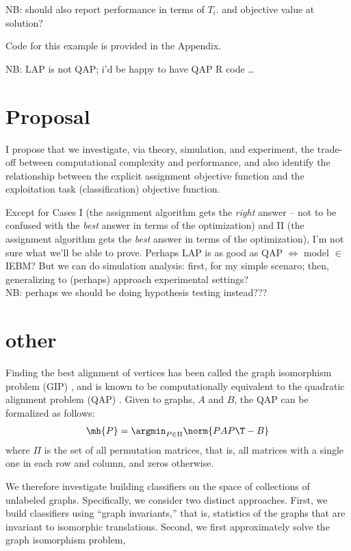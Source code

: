NB:
should also report performance in terms of $T_i$.
and objective value at solution?

Code for this example is provided in the Appendix.

NB: LAP is not QAP; i'd be happy to have QAP R code \dots

\section{Proposal}

I propose that we investigate,
via theory, simulation, and experiment,
the trade-off between computational complexity and performance,
and also identify the relationship between
the explicit assignment objective function
and the exploitation task (classification) objective function.

Except for Cases
I
(the assignment algorithm gets the {\em right} answer --
not to be confused with the {\em best} answer in terms of the optimization)
and
II
(the assignment algorithm gets the {\em best} answer in terms of the optimization),
I'm not sure what we'll be able to prove.
Perhaps
\thma
LAP is as good as QAP $\iff$ model $\in$ IEBM?
\thmb
But we can do simulation analysis:
first, for my simple scenaro;
then, generalizing to (perhaps) approach experimental settings?
\\

NB: perhaps we should be doing hypothesis testing instead???



\section{other} %
\label{sec:other}



Finding the best alignment of vertices has been called the graph isomorphism problem (GIP) \cite{??}, and is known to be computationally equivalent to the quadratic alignment problem (QAP) \cite{??}.  Given to graphs, $A$ and $B$, the QAP can be formalized as follows:
\begin{align}
	\mh{P} = \argmin_{P \in \Pi} \norm{PAP\T - B}
\end{align}
where $\Pi$ is the set of all permutation matrices, that is, all matrices with a single one in each row and column, and zeros otherwise.  


We therefore investigate building classifiers on the space of collections of unlabeled graphs.  Specifically, we consider two distinct approaches. First, we build classifiers using ``graph invariants,'' that is, statistics of the graphs that are invariant to isomorphic translations.  Second, we first approximately solve the graph isomorphism problem,  




